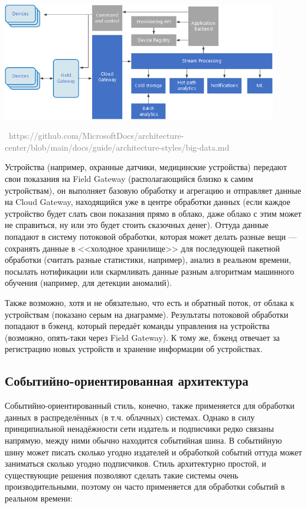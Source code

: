 \documentclass[a5paper]{article}
\newcommand{\attribution}[1] {
    \vspace{-5mm}\begin{flushright}\begin{scriptsize}\textcolor{gray}{\textcopyright\, #1}\end{scriptsize}\end{flushright}
}
\begin{document}
\begin{center}
    \includegraphics[width=0.9\textwidth]{iot.png}
    \attribution{https://github.com/MicrosoftDocs/architecture-center/blob/main/docs/guide/architecture-styles/big-data.md}
\end{center}

Устройства (например, охранные датчики, медицинские устройства) передают свои показания на Field Gateway (располагающийся близко к самим устройствам), он выполняет базовую обработку и агрегацию и отправляет данные на Cloud Gateway, находящийся уже в центре обработки данных (если каждое устройство будет слать свои показания прямо в облако, даже облако с этим может не справиться, ну или это будет стоить сказочных денег). Оттуда данные попадают в систему потоковой обработки, которая может делать разные вещи --- сохранять данные в <<холодное хранилище>> для последующей пакетной обработки (считать разные статистики, например), анализ в реальном времени, посылать нотификации или скармливать данные разным алгоритмам машинного обучения (например, для детекции аномалий).

Также возможно, хотя и не обязательно, что есть и обратный поток, от облака к устройствам (показано серым на диаграмме). Результаты потоковой обработки попадают в бэкенд, который передаёт команды управления на устройства (возможно, опять-таки через Field Gateway). К тому же, бэкенд отвечает за регистрацию новых устройств и хранение информации об устройствах.

\subsection{Событийно-ориентированная архитектура}

Событийно-ориентированный стиль, конечно, также применяется для обработки данных в распределённых (в т.ч. облачных) системах. Однако в силу принципиальной ненадёжности сети издатель и подписчики редко связаны напрямую, между ними обычно находится событийная шина. В событийную шину может писать сколько угодно издателей и обработкой событий оттуда может заниматься сколько угодно подписчиков. Стиль архитектурно простой, и существующие решения позволяют сделать такие системы очень производительными, поэтому он часто применяется для обработки событий в реальном времени:
\end{document}
